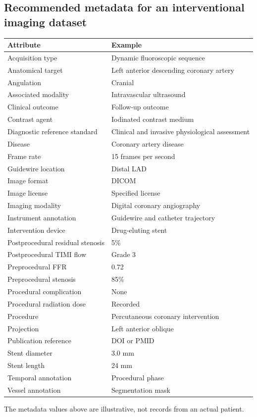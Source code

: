 \subsection{Recommended metadata for an interventional imaging dataset}
\begin{longtable}{@{}p{}p{}@{}}
\toprule
\textbf{Attribute} & \textbf{Example} \\
\midrule
Acquisition type & Dynamic fluoroscopic sequence \\
Anatomical target & Left anterior descending coronary artery \\
Angulation & Cranial \\
Associated modality & Intravascular ultrasound \\
Clinical outcome & Follow-up outcome \\
Contrast agent & Iodinated contrast medium \\
Diagnostic reference standard & Clinical and invasive physiological assessment \\
Disease & Coronary artery disease \\
Frame rate & 15 frames per second \\
Guidewire location & Distal LAD \\
Image format & DICOM \\
Image license & Specified license \\
Imaging modality & Digital coronary angiography \\
Instrument annotation & Guidewire and catheter trajectory \\
Intervention device & Drug-eluting stent \\
Postprocedural residual stenosis & 5\% \\
Postprocedural TIMI flow & Grade 3 \\
Preprocedural FFR & 0.72 \\
Preprocedural stenosis & 85\% \\
Procedural complication & None \\
Procedural radiation dose & Recorded \\
Procedure & Percutaneous coronary intervention \\
Projection & Left anterior oblique \\
Publication reference & DOI or PMID \\
Stent diameter & 3.0 mm \\
Stent length & 24 mm \\
Temporal annotation & Procedural phase \\
Vessel annotation & Segmentation mask \\
\bottomrule
\end{longtable}
The metadata values above are illustrative, not records from an actual patient.

